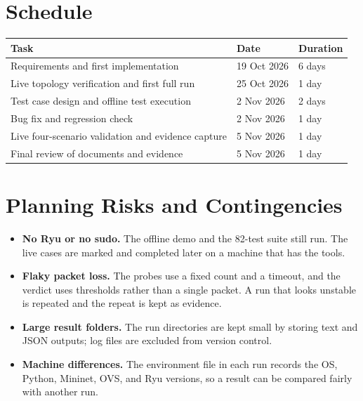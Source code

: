 \documentclass[11pt,a4paper]{article}
\newcommand{\code}[1]{\texttt{\detokenize{#1}}}
\begin{document}
\section{Schedule}
\begin{center}
\renewcommand{\arraystretch}{1.35}
\begin{tabular}{|p{6.2cm}|p{3.0cm}|p{3.2cm}|}
\hline
\textbf{Task} & \textbf{Date} & \textbf{Duration} \\
\hline
Requirements and first implementation & 19 Oct 2026 & 6 days \\
\hline
Live topology verification and first full run & 25 Oct 2026 & 1 day \\
\hline
Test case design and offline test execution & 2 Nov 2026 & 2 days \\
\hline
Bug fix and regression check & 2 Nov 2026 & 1 day \\
\hline
Live four-scenario validation and evidence capture & 5 Nov 2026 & 1 day \\
\hline
Final review of documents and evidence & 5 Nov 2026 & 1 day \\
\hline
\end{tabular}
\end{center}

\section{Planning Risks and Contingencies}
\begin{itemize}
  \item \textbf{No Ryu or no sudo.} The offline demo and the 82-test suite still run. The live cases are marked \code{NOT RUN} and completed later on a machine that has the tools.
  \item \textbf{Flaky packet loss.} The probes use a fixed count and a timeout, and the verdict uses thresholds rather than a single packet. A run that looks unstable is repeated and the repeat is kept as evidence.
  \item \textbf{Large result folders.} The run directories are kept small by storing text and JSON outputs; log files are excluded from version control.
  \item \textbf{Machine differences.} The environment file in each run records the OS, Python, Mininet, OVS, and Ryu versions, so a result can be compared fairly with another run.
\end{itemize}
\end{document}
